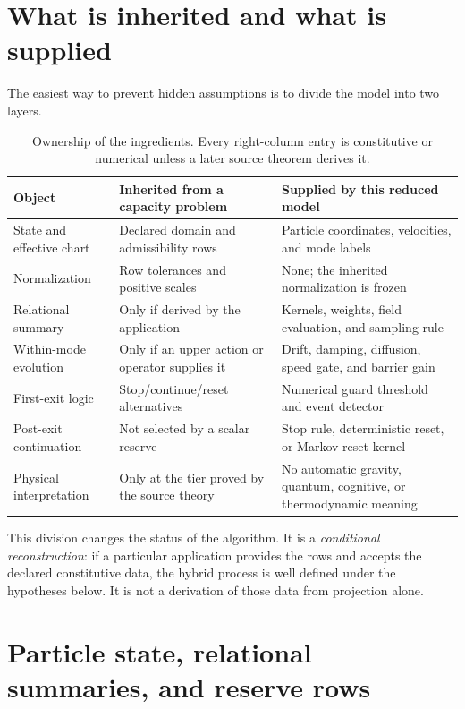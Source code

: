 \documentclass[11pt]{article}
\theoremstyle{definition}
\theoremstyle{remark}
\begin{document}
\section{What is inherited and what is supplied}
\label{sec:ownership}

The easiest way to prevent hidden assumptions is to divide the model into
two layers.

\begin{table}[ht]
\centering
\small
\begin{tabularx}{\textwidth}{L{0.24\textwidth}YY}
\toprule
Object & Inherited from a capacity problem & Supplied by this reduced model \\
\midrule
State and effective chart
  & Declared domain and admissibility rows
  & Particle coordinates, velocities, and mode labels \\
Normalization
  & Row tolerances and positive scales
  & None; the inherited normalization is frozen \\
Relational summary
  & Only if derived by the application
  & Kernels, weights, field evaluation, and sampling rule \\
Within-mode evolution
  & Only if an upper action or operator supplies it
  & Drift, damping, diffusion, speed gate, and barrier gain \\
First-exit logic
  & Stop/continue/reset alternatives
  & Numerical guard threshold and event detector \\
Post-exit continuation
  & Not selected by a scalar reserve
  & Stop rule, deterministic reset, or Markov reset kernel \\
Physical interpretation
  & Only at the tier proved by the source theory
  & No automatic gravity, quantum, cognitive, or thermodynamic meaning \\
\bottomrule
\end{tabularx}
\caption{Ownership of the ingredients.  Every right-column entry is
constitutive or numerical unless a later source theorem derives it.}
\label{tab:ownership}
\end{table}

This division changes the status of the algorithm.  It is a
\emph{conditional reconstruction}: if a particular application provides
the rows and accepts the declared constitutive data, the hybrid process is
well defined under the hypotheses below.  It is not a derivation of those
data from projection alone.

\section{Particle state, relational summaries, and reserve rows}
\label{sec:static}
\end{document}
